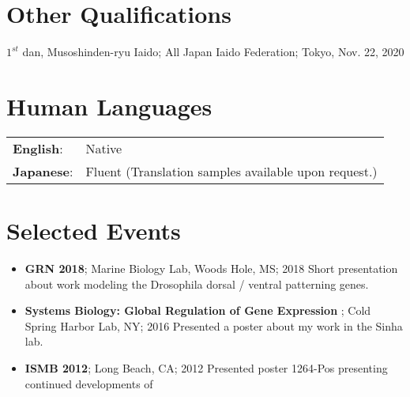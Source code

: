 \section*{Other Qualifications}
$1^{st}$ dan, Musoshinden-ryu Iaido; All Japan Iaido Federation; Tokyo, Nov. 22, 2020\\

\section*{Human Languages}
\begin{tabular}{l l}

{\bf English}: & Native \\
{\bf Japanese}: & Fluent (Translation samples available upon request.) \\

\end{tabular}

\section*{Selected Events}
\begin{itemize}
	\item {\bf GRN 2018};  Marine Biology Lab, Woods Hole, MS; 2018
		\subitem Short presentation about work modeling the Drosophila dorsal / ventral patterning genes.
	
	\item {\bf Systems Biology: Global Regulation of Gene Expression }; Cold Spring Harbor Lab, NY; 2016
		\subitem Presented a poster about my work in the Sinha lab.

	\item {\bf ISMB 2012}; Long Beach, CA; 2012 
		\subitem Presented poster {1264-Pos} presenting continued developments of \cite{MorcosE1293,10.1371/journal.pone.0019729}
	
\end{itemize}

